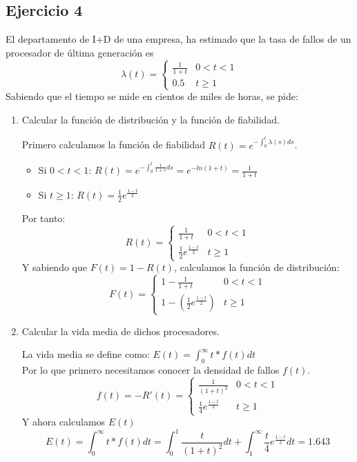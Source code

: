 \subsection{Ejercicio 4}
El  departamento  de  I+D  de  una  empresa,  ha  estimado  que  la  tasa  de fallos  de  un  procesador  de  última generación es
\[ \lambda(t)=\begin{cases} 
      \frac{1}{1+t} & 0<t<1 \\
      0.5 & t\geq 1
   \end{cases}
\]
Sabiendo que el tiempo se mide en cientos de miles de horas, se pide:
\begin{enumerate}
    \item Calcular la función de distribución y la función de fiabilidad.
    \begin{tcolorbox}[colback=white,colframe=cyan!50!black,fonttitle=\bfseries]
    Primero calculamos la función de fiabilidad $R(t) = e^{-\int_0^t \lambda(s) ds}$.
    \begin{itemize}
        \item Si $0<t<1$: $R(t)=e^{-\int_0^t \frac{1}{1+s} ds} = e^{-ln(1+t)} = \frac{1}{1+t}$
        \item Si $t \geq 1$: $R(t)=\frac{1}{2}e^{\frac{1-t}{2}}$
    \end{itemize}
    Por tanto:
    \[ R(t)=\begin{cases} 
      \frac{1}{1+t} & 0<t<1 \\
      \frac{1}{2}e^{\frac{1-t}{2}} & t\geq 1
   \end{cases}
    \]
    Y sabiendo que $F(t) = 1-R(t)$, calculamos la función de distribución:
    \[ F(t)=\begin{cases} 
      1-\frac{1}{1+t} & 0<t<1 \\
      1-(\frac{1}{2}e^{\frac{1-t}{2}}) & t\geq 1
   \end{cases}
    \]
    \end{tcolorbox}
    \item Calcular la vida media de dichos procesadores.
    \begin{tcolorbox}[colback=white,colframe=cyan!50!black,fonttitle=\bfseries]
    La vida media se define como: $E(t)= \int_0^{\infty}t*f(t)dt$\\
    Por lo que primero necesitamos conocer la densidad de fallos $f(t)$.
    \[
    f(t)=-R'(t)=\begin{cases} 
      \frac{1}{(1+t)^2} & 0<t<1 \\
      \frac{1}{4}e^{\frac{1-t}{2}} & t\geq 1
   \end{cases}
    \]
    Y ahora calculamos $E(t)$
    \[
    E(t)= \int_0^{\infty}t*f(t)dt= \int_0^1\frac{t}{(1+t)^2}dt + \int_1^{\infty}\frac{t}{4}e^{\frac{1-t}{2}}dt = 1.643
    \]
    \end{tcolorbox}
\end{enumerate}
